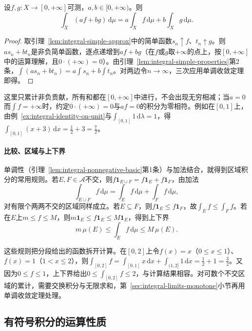 \begin{theorem}[非负积分的线性]
\label{thm:integral-nonnegative-linear}
设$f,g:X\to[0,+\infty]$可测，$a,b\in[0,+\infty)$。则
\[
 \int_X(af+bg)\,\mathrm d\mu=a\int_Xf\,\mathrm d\mu+b\int_Xg\,\mathrm d\mu.
\]
\end{theorem}

\begin{proof}
取引理~\ref{lem:integral-simple-approx}中的简单函数$s_n\uparrow f$、$t_n\uparrow g$。则$as_n+bt_n$是非负简单函数，逐点递增到$af+bg$（在$f$或$g$取$+\infty$的点上，按$[0,+\infty]$中的运算理解，且$0\cdot(+\infty)=0$）。由引理~\ref{lem:integral-simple-properties}第2条，$\int(as_n+bt_n)=a\int s_n+b\int t_n$。对两边令$n\to\infty$，三次应用单调收敛定理即得。
\end{proof}

这里只累计非负贡献，所有和都在$[0,+\infty]$中进行，不会出现无穷相减；当$a=0$而$\int f=+\infty$时，约定$0\cdot(+\infty)=0$与$af=0$的积分为零相符。例如在$[0,1]$上，由例~\ref{ex:integral-identity-on-unit}与$\int_{[0,1]}1\,\mathrm d\lambda=1$，得$\int_{[0,1]}(x+3)\,\mathrm dx=\tfrac12+3=\tfrac72$。

\paragraph{比较、区域与上下界}
单调性（引理~\ref{lem:integral-nonnegative-basic}第1条）与加法结合，就得到区域积分的常用规则。若$E,F\in\mathcal A$不交，则$f\mathbf 1_{E\cup F}=f\mathbf 1_E+f\mathbf 1_F$，由加法
\[
 \int_{E\cup F}f\,\mathrm d\mu=\int_Ef\,\mathrm d\mu+\int_Ff\,\mathrm d\mu,
\]
对有限个两两不交的区域同样成立。若$E\subseteq F$，则$f\mathbf 1_E\le f\mathbf 1_F$，故$\int_Ef\le\int_Ff$。若在$E$上$m\le f\le M$，则$m\mathbf 1_E\le f\mathbf 1_E\le M\mathbf 1_E$，得到上下界
\[
 m\,\mu(E)\le\int_Ef\,\mathrm d\mu\le M\,\mu(E).
\]

这些规则把分段给出的函数拆开计算。在$[0,2]$上令$f(x)=x$（$0\le x\le1$）、$f(x)=1$（$1<x\le2$），则$\int_{[0,2]}f=\int_{[0,1]}x\,\mathrm dx+\int_{(1,2]}1\,\mathrm dx=\tfrac12+1=\tfrac32$。又因为$0\le f\le1$，上下界给出$0\le\int_{[0,2]}f\le2$，与计算结果相容。对可数个不交区域的累计，需要交换积分与无限求和，第~\ref{sec:integral-limits-monotone}小节再用单调收敛定理处理。

\subsection{有符号积分的运算性质}
\label{sec:integral-signed-rules}

